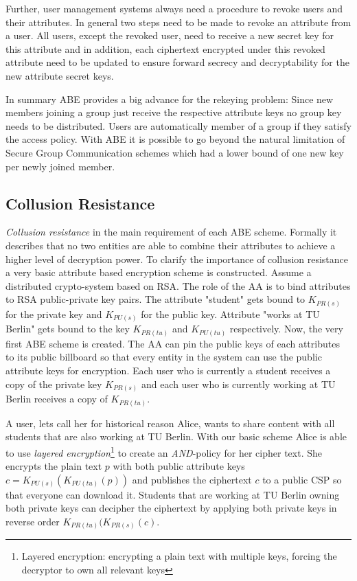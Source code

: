 Further, user management systems always need a procedure to revoke users and their attributes. 
In general two steps need to be made to revoke an attribute from a user. All users, except the revoked user, need to receive a new secret key for this attribute and in addition, each ciphertext encrypted under this revoked attribute need to be updated to ensure forward secrecy and decryptability for the new attribute secret keys. 

In summary ABE provides a big advance for the rekeying problem: Since new members joining a group just receive the respective attribute keys no group key needs to be distributed. Users are automatically member of a group if they satisfy the access policy. With \ac{ABE} it is possible to go beyond the natural limitation of Secure Group Communication schemes which had a lower bound of one new key per newly joined member.  


\subsection{Collusion Resistance}
\textit{Collusion resistance} in the main requirement of each ABE scheme. Formally it describes that no two entities are able to combine their attributes to achieve a higher level of decryption power. To clarify the importance of collusion resistance a very basic attribute based encryption scheme is constructed. Assume a distributed crypto-system based on \ac{RSA}. The role of the \ac{AA} is to bind attributes to \ac{RSA} public-private key pairs. The attribute "student" gets bound to $K_{PR(s)}$ for the private key and $K_{PU(s)}$ for the public key. Attribute "works at TU Berlin" gets bound to the key $K_{PR(tu)}$ and $K_{PU(tu)}$ respectively. Now, the very first ABE scheme is created. The AA can pin the public keys of each attributes to its public billboard so that every entity in the system can use the public attribute keys for encryption. Each user who is currently a student receives a copy of the private key $K_{PR(s)}$ and each user who is currently working at TU Berlin receives a copy of $K_{PR(tu)}$. 

A user, lets call her for historical reason Alice, wants to share content with all students that are also working at TU Berlin. With our basic scheme Alice is able to use \textit{layered encryption}\footnote{Layered encryption: encrypting a plain text with multiple keys, forcing the decryptor to own all relevant keys} to create an \textit{AND}-policy for her cipher text. She encrypts the plain text $p$ with both public attribute keys $c = K_{PU(s)}(K_{PU(tu)}(p))$ and publishes the ciphertext $c$ to a public CSP so that everyone can download it. Students that are working at TU Berlin owning both private keys can decipher the ciphertext by applying both private keys in reverse order $K_{PR(tu)}(K_{PR(s)}(c)$.

